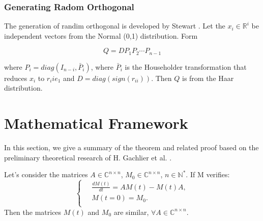 \subsubsection{Generating Radom Orthogonal}

The generation of randim orthogonal is developed by Stewart \cite{stewart1980efficient}. Let the $x_i \in \mathbb{R}^i$ be independent vectors from the Normal (0,1) distribution. Form 

\begin{equation}
	Q=DP_1P_2\cdots P_{n-1}
\end{equation}

where $P_i=diag(I_{n-i},\bar{P}_i)$, where $\bar{P}_i$ is the Householder transformation that reduces $x_i$ to $r_iie_1$ and $D=diag(sign(r_{ii}))$. Then $Q$ is from the Haar distribution.

\section{Mathematical Framework}\label{Mathematical Framework}

In this section, we give a summary of the theorem and related proof based on the preliminary theoretical research of H. Gachlier et al. \cite{galichergenerate}.


\begin{theorem}
	\label{theo1}
	Let's consider the matrices $A \in \mathbb{C}^{n \times n}$, $M_0  \in \mathbb{C}^{n \times n}$, $n \in \mathbb{N}^*$. If M verifies: 
	\[
	\left\{\
	\begin{aligned}
	&\frac{dM(t)}{dt} = AM(t) - M(t)A, \\
	&M(t=0) = M_0. \\ 
	\end{aligned}
	\right.
	\]
	Then the matrices $M(t)$ and $M_0$ are similar, $\forall A \in \mathbb{C}^{n \times n}$. 
\end{theorem}

